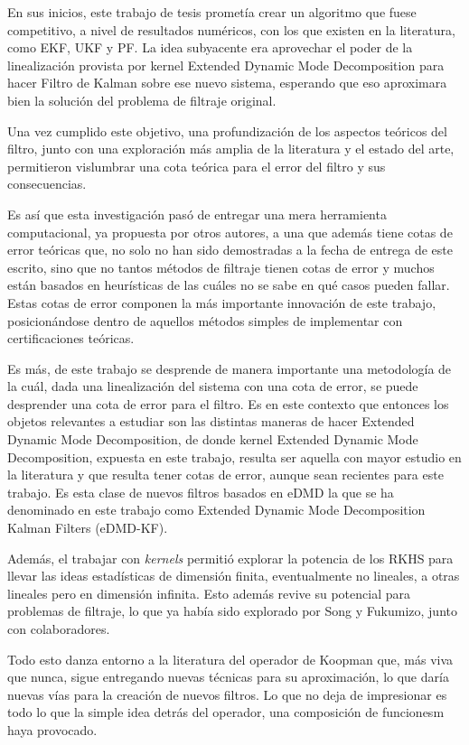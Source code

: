 En sus inicios, este trabajo de tesis prometía crear un algoritmo que fuese competitivo, a nivel de resultados numéricos, con los que existen en la literatura, como EKF, UKF y PF. La idea subyacente era aprovechar el poder de la linealización provista por kernel Extended Dynamic Mode Decomposition para hacer Filtro de Kalman sobre ese nuevo sistema, esperando que eso aproximara bien la solución del problema de filtraje original.

Una vez cumplido este objetivo, una profundización de los aspectos teóricos del filtro, junto con una exploración más amplia de la literatura y el estado del arte, permitieron vislumbrar una cota teórica para el error del filtro y sus consecuencias.

Es así que esta investigación pasó de entregar una mera herramienta computacional, ya propuesta por otros autores, a una que además tiene cotas de error teóricas que, no solo no han sido demostradas a la fecha de entrega de este escrito, sino que no tantos métodos de filtraje tienen cotas de error y muchos están basados en heurísticas de las cuáles no se sabe en qué casos pueden fallar. Estas cotas de error componen la más importante innovación de este trabajo, posicionándose dentro de aquellos métodos simples de implementar con certificaciones teóricas.

Es más, de este trabajo se desprende de manera importante una metodología de la cuál, dada una linealización del sistema con una cota de error, se puede desprender una cota de error para el filtro. Es en este contexto que entonces los objetos relevantes a estudiar son las distintas maneras de hacer Extended Dynamic Mode Decomposition, de donde kernel Extended Dynamic Mode Decomposition, expuesta en este trabajo, resulta ser aquella con mayor estudio en la literatura y que resulta tener cotas de error, aunque sean recientes para este trabajo. Es esta clase de nuevos filtros basados en eDMD la que se ha denominado en este trabajo como Extended Dynamic Mode Decomposition Kalman Filters (eDMD-KF).

Además, el trabajar con \textit{kernels} permitió explorar la potencia de los RKHS para llevar las ideas estadísticas de dimensión finita, eventualmente no lineales, a otras lineales pero en dimensión infinita. Esto además revive su potencial para problemas de filtraje, lo que ya había sido explorado por Song y Fukumizo, junto con colaboradores.

Todo esto danza entorno a la literatura del operador de Koopman que, más viva que nunca, sigue entregando nuevas técnicas para su aproximación, lo que daría nuevas vías para la creación de nuevos filtros. Lo que no deja de impresionar es todo lo que la simple idea detrás del operador, una composición de funcionesm haya provocado.


